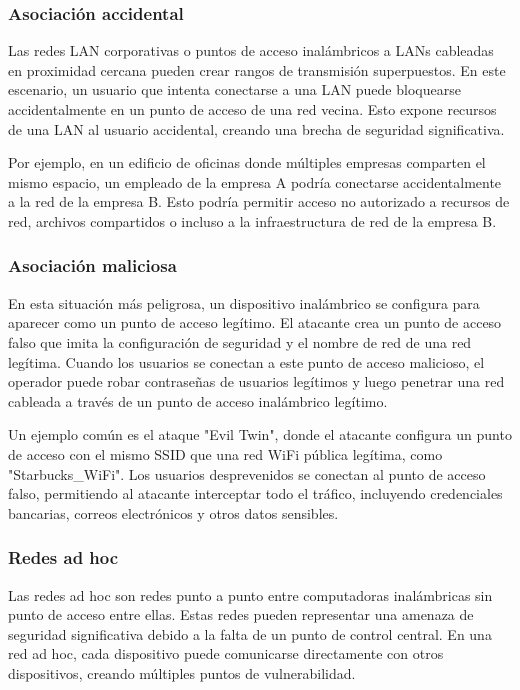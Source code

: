 \subsubsection{Asociación accidental}

Las redes LAN corporativas o puntos de acceso inalámbricos a LANs cableadas en proximidad cercana pueden crear rangos de transmisión superpuestos. En este escenario, un usuario que intenta conectarse a una LAN puede bloquearse accidentalmente en un punto de acceso de una red vecina. Esto expone recursos de una LAN al usuario accidental, creando una brecha de seguridad significativa.

Por ejemplo, en un edificio de oficinas donde múltiples empresas comparten el mismo espacio, un empleado de la empresa A podría conectarse accidentalmente a la red de la empresa B. Esto podría permitir acceso no autorizado a recursos de red, archivos compartidos o incluso a la infraestructura de red de la empresa B.

\subsubsection{Asociación maliciosa}

En esta situación más peligrosa, un dispositivo inalámbrico se configura para aparecer como un punto de acceso legítimo. El atacante crea un punto de acceso falso que imita la configuración de seguridad y el nombre de red de una red legítima. Cuando los usuarios se conectan a este punto de acceso malicioso, el operador puede robar contraseñas de usuarios legítimos y luego penetrar una red cableada a través de un punto de acceso inalámbrico legítimo.

Un ejemplo común es el ataque "Evil Twin", donde el atacante configura un punto de acceso con el mismo SSID que una red WiFi pública legítima, como "Starbucks\_WiFi". Los usuarios desprevenidos se conectan al punto de acceso falso, permitiendo al atacante interceptar todo el tráfico, incluyendo credenciales bancarias, correos electrónicos y otros datos sensibles.

\subsubsection{Redes ad hoc}

Las redes ad hoc son redes punto a punto entre computadoras inalámbricas sin punto de acceso entre ellas. Estas redes pueden representar una amenaza de seguridad significativa debido a la falta de un punto de control central. En una red ad hoc, cada dispositivo puede comunicarse directamente con otros dispositivos, creando múltiples puntos de vulnerabilidad.

